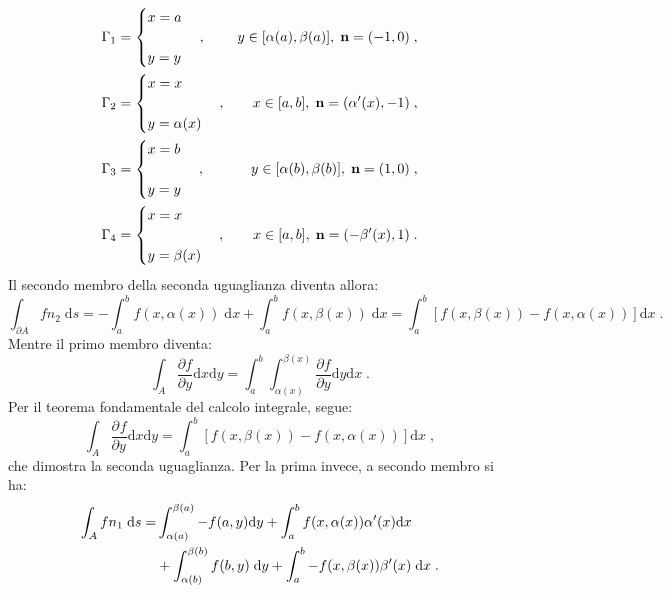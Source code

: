 \documentclass[a4paper,12pt]{report}
\theoremstyle{plain}
\theoremstyle{definition}
\theoremstyle{remark}
\newcommand{\diff}[1]{\mathrm{d}#1}
\newcommand{\pdev}[3][]{\frac{\partial^{#1}#2}{\partial #3^{#1}}}
\numberwithin{equation}{section}
\begin{document}
\begin{align}
&\Gamma_1=\begin{cases}
x=a \\
\\
y=y
\end{cases}, &y\in [\alpha(a),\beta(a)],\; \mathbf{n}=(-1,0)\;, \notag \\
&\Gamma_2=\begin{cases}
x=x \\
\\
y=\alpha(x)
\end{cases}, &x\in[a,b],\; \mathbf{n}=(\alpha'(x),-1)\;, \notag \\
&\Gamma_3=\begin{cases}
x=b \\
\\
y=y
\end{cases}, &y\in [\alpha(b),\beta(b)],\; \mathbf{n}=(1,0)\;, \notag \\
&\Gamma_4=\begin{cases}
x=x \\
\\
y=\beta(x)
\end{cases}, & x\in [a,b],\; \mathbf{n}=(-\beta'(x),1)\;.
\end{align}
Il secondo membro della seconda uguaglianza diventa allora:
\begin{equation}
\int_{\partial A} f n_2\;\diff{s}=-\int_a^b f(x,\alpha(x))\;\diff{x}+\int_a^b f(x,\beta(x))\;\diff{x}=\int_a^b\left[f(x,\beta(x))-f(x,\alpha(x))\right]\diff{x}\;.
\end{equation}
Mentre il primo membro diventa:
\begin{equation}
\int_A \frac{\partial f}{\partial y}\diff{x}\diff{y}=\int_a^b\int_{\alpha(x)}^{\beta(x)} \frac{\partial f}{\partial y}\diff{y}\diff{x}\;.
\end{equation}
Per il teorema fondamentale del calcolo integrale, segue:
\begin{equation}
\int_A\pdev{f}{y}\diff{x}\diff{y}=\int_a^b\left[f(x,\beta(x))-f(x,\alpha(x))\right]\diff{x}\;,
\end{equation}
che dimostra la seconda uguaglianza. Per la prima invece, a secondo membro si ha:
\begin{align}
\int_A fn_1\;\diff{s}= &\int_{\alpha(a)}^{\beta(a)}-f(a,y)\diff{y}+\int_a^bf(x,\alpha(x))\alpha'(x)\diff{x}\notag \\
&+\int_{\alpha(b)}^{\beta(b)}f(b,y)\;\diff{y}+\int_a^b-f(x,\beta(x))\beta'(x)\;\diff{x}\;.
\end{align}
\end{document}
